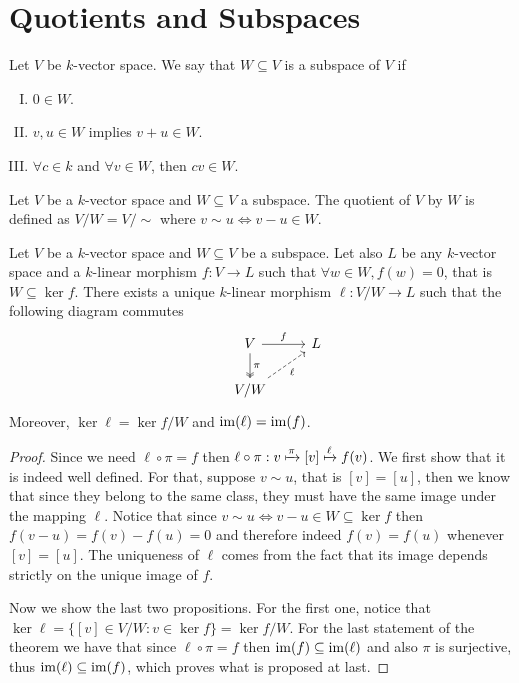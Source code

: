 \section{Quotients and Subspaces}

\begin{definition}[Subspace]\label{def: subspace}
   Let \(V\) be \(k\)-vector space. We say that \(W \subseteq  V\) is a subspace
   of \(V\) if 
   \begin{enumerate}[I.]
     \item \(0 \in W\).
     \item \(v, u \in W\) implies \(v + u \in W\).
     \item \(\forall c \in k\) and \(\forall v \in W\), then \(cv \in W\).
   \end{enumerate}
\end{definition}

\begin{definition}[Quotient]\label{def: quotient}
   Let \(V\) be a \(k\)-vector space and \(W \subseteq V\) a subspace. The
   quotient of \(V\) by \(W\) is defined as \(V/W = V/\sim\) where \(v
   \sim u \Leftrightarrow v - u \in W\).
\end{definition}

\begin{theorem}
  \label{thm: universal property for quotients}
  Let \(V\) be a \(k\)-vector space and \(W \subseteq V\) be a subspace. Let
  also \(L\) be any \(k\)-vector space and a \(k\)-linear morphism \(f : V \to L
  \) such that \(\forall w \in W, f(w) = 0\), that is \(W \subseteq \ker f\).
  There exists a unique \(k\)-linear morphism \(\ell: V/W \to L\) such that the
  following diagram commutes
  \[
    \begin{tikzcd}
       &V \ar["f", r] \ar["\pi", twoheadrightarrow, d] &L \\
       &V/W \ar[swap, dashed, "\ell", ru]
    \end{tikzcd}
  \] 
  Moreover, \(\ker \ell = \ker f / W\) and  \(\operatorname{im}(\ell) = \operatorname{im}(f)\).
\end{theorem}

\begin{proof}
  Since we need \(\ell \circ \pi = f\) then \(\ell \circ \pi : v \xmapsto \pi
  [v] \xmapsto \ell f(v)\). We first show that it is indeed well
  defined. For that, suppose \(v \sim u\), that is \([v] =
  [u]\), then we know that since they belong to the same class, they must have the
  same image under the mapping \(\ell\). Notice that since \(v \sim u
  \Leftrightarrow v - u \in W \subseteq \ker f\) then \(f(v - u) = f(v) - f(u) =
  0\) and therefore indeed \(f(v) = f(u)\) whenever \([v] =
  [u]\). The uniqueness of \(\ell\) comes from the fact that its image depends
  strictly on the unique image of \(f\).

  Now we show the last two propositions. For the first one, notice that \(\ker
  \ell = \{[v] \in V/W : v \in \ker f\} = \ker f / W\). For the last
  statement of the theorem we have that since \(\ell \circ \pi = f\) then
  \(\operatorname{im}(f) \subseteq \operatorname{im}(\ell)\) and also \(\pi\) is surjective, thus
  \(\operatorname{im}(\ell) \subseteq \operatorname{im}(f)\), which proves what is proposed at last.
\end{proof}

